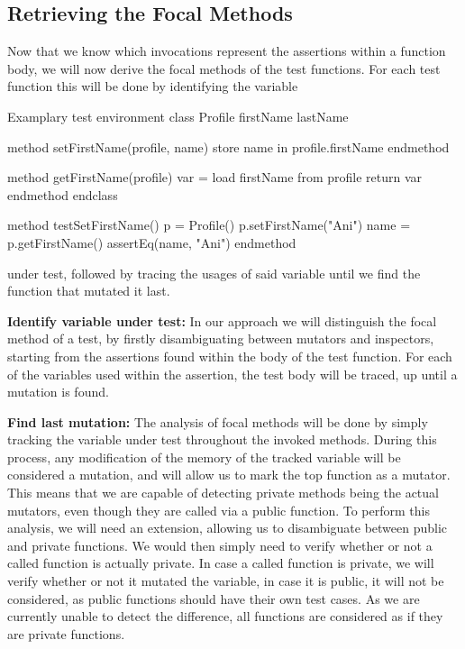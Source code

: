 \documentclass[11pt]{article}
\begin{document}
\begin{multicols}{2}
\subsection{Retrieving the Focal Methods}
Now that we know which invocations represent the assertions within a function body, we will now derive the focal methods of the test functions. For each test function this will be done by identifying the variable
\begin{sexylisting}{Examplary test environment}
class Profile
  firstName
  lastName
	
  method setFirstName(profile, name)
    store name in profile.firstName
  endmethod
	
  method getFirstName(profile)
    var = load firstName from profile
    return var
  endmethod
endclass
	
method testSetFirstName()
  p = Profile()
  p.setFirstName("Ani")
  name = p.getFirstName()
  assertEq(name, "Ani")
endmethod
\end{sexylisting}

\noindent
 under test, followed by tracing the usages of said variable until we find the function that mutated it last.

\noindent
\textbf{Identify variable under test:} In our approach we will distinguish the focal method of a test, by firstly disambiguating between mutators and inspectors, starting from the assertions found within the body of the test function. For each of the variables used within the assertion, the test body will be traced, up until a mutation is found.

\noindent
\textbf{Find last mutation:} The analysis of focal methods will be done by simply tracking the variable under test throughout the invoked methods. During this process, any modification of the memory of the tracked variable will be considered a mutation, and will allow us to mark the top function as a mutator. This means that we are capable of detecting private methods being the actual mutators, even though they are called via a public function. To perform this analysis, we will need an extension, allowing us to disambiguate between public and private functions. We would then simply need to verify whether or not a called function is actually private. In case a called function is private, we will verify whether or not it mutated the variable, in case it is public, it will not be considered, as public functions should have their own test cases. As we are currently unable to detect the difference, all functions are considered as if they are private functions.


\end{multicols}
\end{document}

